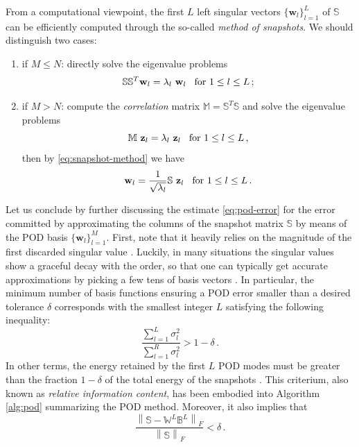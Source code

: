 \documentclass[12pt, a4paper, twoside, openright]{report}
\numberwithin{equation}{chapter}
\theoremstyle{theorem}
\theoremstyle{definition}
\theoremstyle{remark}
\theoremstyle{proposition}
\numberwithin{figure}{chapter}
\newcommand{\norm}[1]{\left\lVert#1\right\rVert}
\begin{document}
		From a computational viewpoint, the first $L$ left singular vectors $\big\lbrace \mathbf{w}_l \big\rbrace_{l = 1}^L$ of $\mathbb{S}$ can be efficiently computed through the so-called \emph{method of snapshots}. We should distinguish two cases:
		\begin{enumerate}[label=(\alph*)]
			\item if $M \leq N$: directly solve the eigenvalue problems
			\begin{equation*}
				\mathbb{S} \mathbb{S}^T \mathbf{w}_l = \lambda_l ~ \mathbf{w}_l \hspace*{0.3cm} \text{for $1 \leq l \leq L$} \, ;
			\end{equation*}
			\item if $M > N$: compute the \emph{correlation} matrix $\mathbb{M} = \mathbb{S}^T \mathbb{S}$ and solve the eigenvalue problems
			\begin{equation*}
				\mathbb{M} ~ \mathbf{z}_l = \lambda_l ~ \mathbf{z}_l \hspace*{0.3cm} \text{for $1 \leq l \leq L$} \, ,
			\end{equation*} 
			then by \eqref{eq:snapshot-method} we have
			\begin{equation*}
				\mathbf{w}_l = \dfrac{1}{\sqrt{\lambda_l}} \mathbb{S} ~ \mathbf{z}_l \hspace*{0.3cm} \text{for $1 \leq l \leq L$} \, .
			\end{equation*}
		\end{enumerate}
		
		Let us conclude by further discussing the estimate \eqref{eq:pod-error} for the error committed by approximating the columns of the snapshot matrix $\mathbb{S}$ by means of the POD basis $\big\lbrace \mathbf{w}_l \big\rbrace_{l = 1}^M$. First, note that it heavily relies on the magnitude of the first discarded singular value \cite{HSR16}. Luckily, in many situations the singular values show a graceful decay with the order, so that one can typically get accurate approximations by picking a few tens of basis vectors \cite{Bur06}. In particular, the minimum number of basis functions ensuring a POD error smaller than a desired tolerance $\delta$ corresponds with the smallest integer $L$ satisfying the following inequality:
		\begin{equation}
			\label{eq:relative-information-content}
			\dfrac{\sum_{l = 1}^{L} \sigma_l^2}{\sum_{l = 1}^R \sigma_l^2} > 1 - \delta \, .
		\end{equation}
		In other terms, the energy retained by the first $L$ POD modes must be greater than the fraction $1 - \delta$ of the total energy of the snapshots \cite{QMN15}. This criterium, also known as \emph{relative information content}, has been embodied into Algorithm \ref{alg:pod} summarizing the POD method. Moreover, it also implies that
		\begin{equation*}
			\dfrac{\norm{\mathbb{S} - \mathbb{W}^{L} \mathbb{B}^{L}}_F}{\norm{\mathbb{S}}_F} < \delta \, .
		\end{equation*}
		
\end{document}
